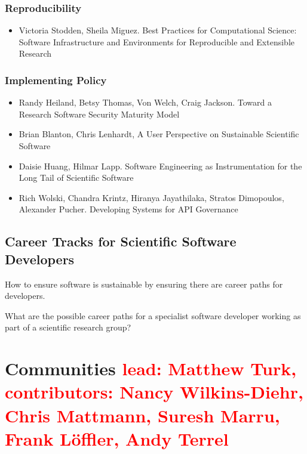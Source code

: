\documentclass[11pt, oneside]{amsart}
\newcommand{\note}[1]{ {\textcolor{red}    { #1 }}}
\begin{document}
\subsubsection*{Reproducibility}

\begin{itemize}

\item Victoria Stodden, Sheila Miguez. Best Practices for
  Computational Science: Software Infrastructure and Environments for
  Reproducible and Extensible Research \cite{Stodden_WSSSPE}

\end{itemize}

\subsubsection*{Implementing Policy}

\begin{itemize}

\item Randy Heiland, Betsy Thomas, Von Welch, Craig Jackson. Toward a
  Research Software Security Maturity Model \cite{Heiland_WSSSPE}

\item Brian Blanton, Chris Lenhardt, A User Perspective on Sustainable
  Scientific Software \cite{Blanton_WSSSPE}

\item Daisie Huang, Hilmar Lapp. Software Engineering as
  Instrumentation for the Long Tail of Scientific Software
  \cite{Huang_WSSSPE}

\item Rich Wolski, Chandra Krintz, Hiranya Jayathilaka, Stratos
  Dimopoulos, Alexander Pucher. Developing Systems for API Governance
  \cite{Wolski_WSSSPE}

\end{itemize}


\subsection{Career Tracks for Scientific Software Developers}

How to ensure software is sustainable by ensuring there are career
paths for developers.

What are the possible career paths for a specialist software developer working as part of a scientific research group?

\section{Communities \note{lead: Matthew Turk, contributors: Nancy Wilkins-Diehr, Chris Mattmann, Suresh Marru, Frank L\"{o}ffler, Andy Terrel}} \label{sec:community}
\end{document}
